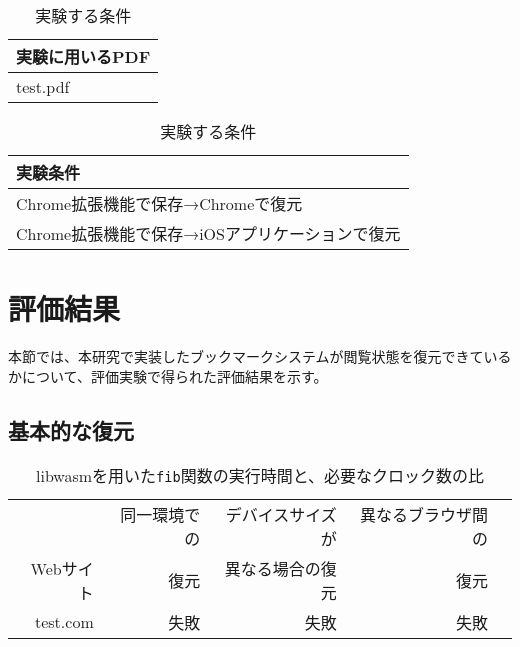 \begin{table}[htbp]
  \label{tb:evl-pdf-list}
  \caption{実験する条件}
  \begin{center}
    \begin{tabular}{|l|}
    \hline
    実験に用いるPDF  \\ \hline
    test.pdf \\ \hline
    \end{tabular}
  \end{center}
\end{table}

\begin{table}[htbp]
  \label{tb:evl-pdf-conditions}
  \caption{実験する条件}
  \begin{center}
    \begin{tabular}{|l|}
    \hline
    実験条件  \\ \hline
    Chrome拡張機能で保存→Chromeで復元 \\ \hline
    Chrome拡張機能で保存→iOSアプリケーションで復元 \\ \hline
    \end{tabular}
  \end{center}
\end{table}

\section{評価結果}
本節では、本研究で実装したブックマークシステムが閲覧状態を復元できているかについて、評価実験で得られた評価結果を示す。

\subsection{基本的な復元}

\begin{table}[htbp]
  \caption{libwasmを用いた{\tt fib}関数の実行時間と、必要なクロック数の比}
  \label{tab:fib_time}
  \begin{center}
    \begin{tabular}{rrrrr}
      \hline
      & 同一環境での & デバイスサイズが & 異なるブラウザ間の \\
       Webサイト & 復元 & 異なる場合の復元 & 復元 \\ \hline \hline
      test.com & 失敗 & 失敗 &  失敗 \\ \hline
    \end{tabular}
  \end{center}
\end{table}

